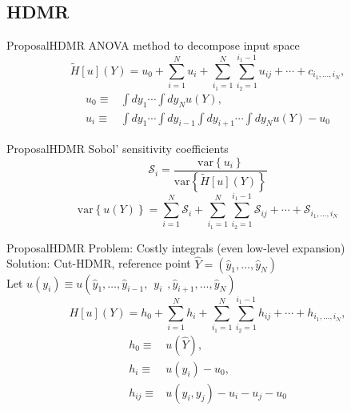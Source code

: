 \documentclass{beamer}
\begin{document}
\subsection{HDMR}
\begin{frame}{Proposal}{HDMR}\vspace{-20pt}
  ANOVA method to decompose input space
  \begin{equation*}
  \tilde H[u](Y) = u_0 + \sum_{i=1}^N u_i + \sum_{i_1=1}^N\sum_{i_2=1}^{i_1-1}u_{ij}+\cdots +
      c_{i_1,\ldots,i_N},
  \end{equation*}
  \begin{align*}
    u_0 \equiv& \int dy_1\cdots\int dy_N u(Y), \\
    u_i \equiv& \int dy_1\cdots\int dy_{i-1}\int dy_{i+1}\cdots\int dy_N u(Y) - u_0
  \end{align*}
\end{frame}

\begin{frame}{Proposal}{HDMR}\vspace{-20pt}
  Sobol' sensitivity coefficients
  \begin{equation*}
    \mathcal{S}_i = \frac{\text{var}\left\{u_i\right\}}{\text{var}\left\{\tilde H[u](Y)\right\}}
  \end{equation*}
  \begin{equation*}
    \text{var}\left\{u(Y)\right\}= \sum_{i=1}^N \mathcal{S}_i + \sum_{i_1=1}^N\sum_{i_2=1}^{i_1-1}
    \mathcal{S}_{ij}+\cdots+\mathcal{S}_{i_1,\ldots,i_N}
  \end{equation*}
\end{frame}

\begin{frame}{Proposal}{HDMR}%
  Problem: Costly integrals (even low-level expansion)\\
  Solution: Cut-HDMR, reference point $\hat Y=(\hat y_1,\ldots,\hat y_N)$\\
  Let $u(y_i) \equiv u(\hat y_1,\ldots,\hat y_{i-1},\hspace{5pt}y_i\hspace{5pt},\hat y_{i+1},\ldots,\hat y_N)$
  \begin{equation*}
  H[u](Y) = h_0 + \sum_{i=1}^N h_i + \sum_{i_1=1}^N\sum_{i_2=1}^{i_1-1}h_{ij}+\cdots +
      h_{i_1,\ldots,i_N},
  \end{equation*}
  \begin{align*}
    h_0 \equiv& u(\hat Y), \\
    h_i \equiv& u(y_i) - u_0, \\
    h_{ij} \equiv& u(y_i,y_j) -u_i - u_j - u_0
  \end{align*}
\end{frame}
\end{document}
